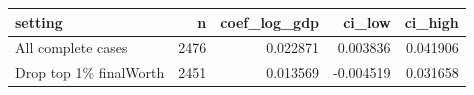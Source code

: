 \begin{tabular}{lrrrr}
\toprule
setting & n & coef\_log\_gdp & ci\_low & ci\_high \\
\midrule
All complete cases & 2476 & 0.022871 & 0.003836 & 0.041906 \\
Drop top 1\% finalWorth & 2451 & 0.013569 & -0.004519 & 0.031658 \\
\bottomrule
\end{tabular}
